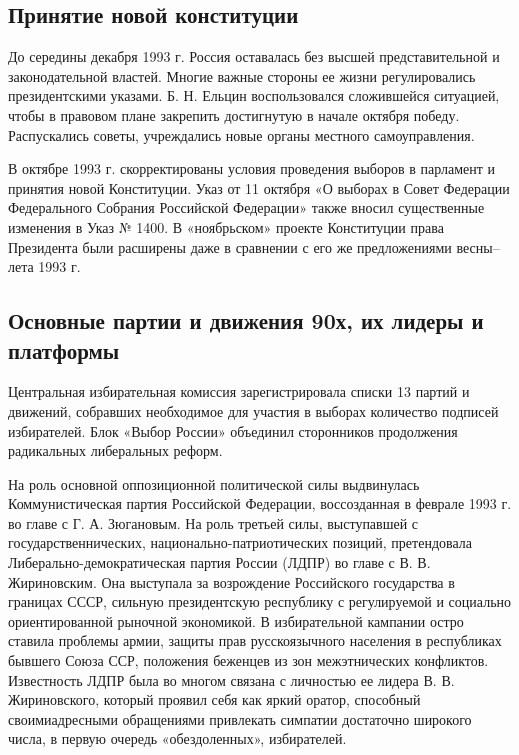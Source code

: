 \subsection{Принятие новой конституции}

До середины декабря 1993 г. Россия оставалась без высшей представительной и законодательной властей. Многие важные стороны ее жизни регулировались президентскими указами. Б. Н. Ельцин воспользовался сложившейся ситуацией, чтобы в правовом плане закрепить достигнутую в начале октября победу. Распускались советы, учреждались новые органы местного самоуправления.

В октябре 1993 г. скорректированы условия проведения выборов в парламент и принятия новой Конституции. Указ от 11 октября «О выборах в Совет Федерации Федерального Собрания Российской Федерации» также вносил существенные изменения в Указ № 1400. В «ноябрьском» проекте Конституции права Президента были расширены даже в сравнении с его же предложениями весны–лета 1993 г.

\subsection{Основные партии и движения 90х, их лидеры и платформы}
Центральная избирательная комиссия зарегистрировала списки 13 партий и движений, собравших необходимое для участия в выборах количество подписей избирателей. Блок «Выбор России» объединил сторонников продолжения радикальных либеральных реформ.

На роль основной оппозиционной политической силы выдвинулась Коммунистическая партия Российской Федерации, воссозданная в феврале 1993 г. во главе с Г. А. Зюгановым. На роль третьей силы, выступавшей с государственнических, национально-патриотических позиций, претендовала Либерально-демократическая партия России (ЛДПР) во главе с В. В. Жириновским. Она выступала за возрождение Российского государства в границах СССР, сильную президентскую республику с регулируемой и социально ориентированной рыночной экономикой. В избирательной кампании остро ставила проблемы армии, защиты прав русскоязычного населения в республиках бывшего Союза ССР, положения беженцев из зон межэтнических конфликтов. Известность ЛДПР была во многом связана с личностью ее лидера В. В. Жириновского, который проявил себя как яркий оратор, способный своимиадресными обращениями привлекать симпатии достаточно широкого числа, в первую очередь «обездоленных», избирателей.

